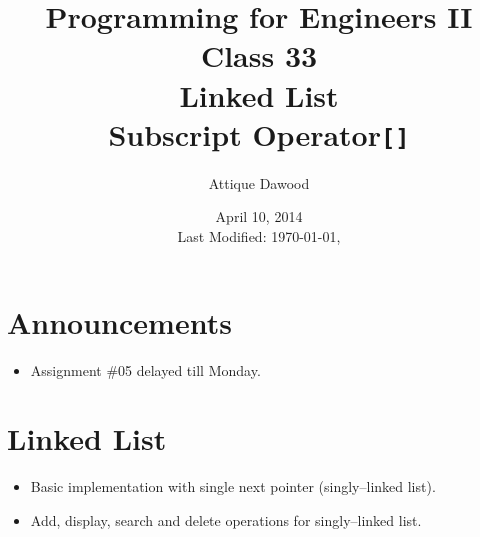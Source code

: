 \documentclass[12pt,a4paper]{article}
\title{\vspace{-2cm}Programming for Engineers II\\Class 33\\Linked List\\Subscript Operator\texttt{[]}}
\author{Attique Dawood}
\date{April 10, 2014\\[0.2cm] Last Modified: \today, \currenttime}
\begin{document}
\maketitle
\section{Announcements}
\begin{itemize}
\item Assignment \#05 delayed till Monday.
\end{itemize}
\section{Linked List}
\begin{itemize}
\item Basic implementation with single next pointer (singly--linked list).
\item Add, display, search and delete operations for singly--linked list.
\end{itemize}
\end{document}

